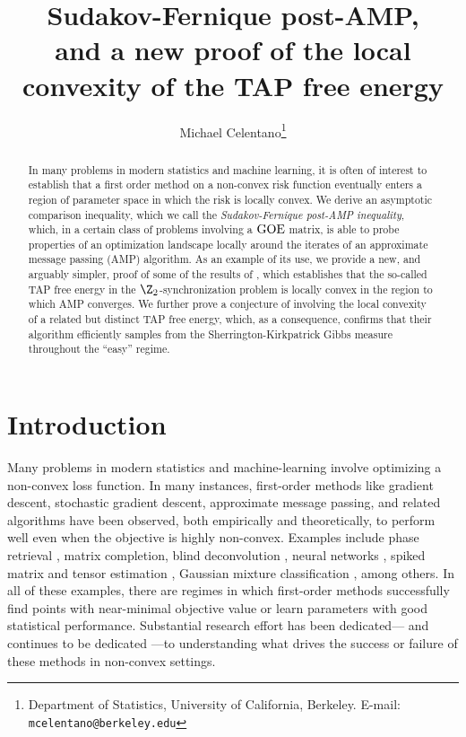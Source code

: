 \documentclass[]{article}
\def\GOE{{\rm GOE}}
\begin{document}
\title{Sudakov-Fernique post-AMP,\\ and a new proof of the local convexity of the TAP free energy}
\author{Michael Celentano\thanks{Department of Statistics, University of California, Berkeley.
E-mail: \texttt{mcelentano@berkeley.edu}}}
\maketitle

\begin{abstract}
    In many problems in modern statistics and machine learning,
    it is often of interest to establish that a first order method on a non-convex risk function eventually enters a region of parameter space in which the risk is locally convex.
    We derive an asymptotic comparison inequality, which we call the \emph{Sudakov-Fernique post-AMP inequality}, which, in a certain class of problems involving a $\GOE$ matrix,
    is able to probe properties of an optimization landscape locally around the iterates of an approximate message passing (AMP) algorithm.
    As an example of its use,
    we provide a new, and arguably simpler, proof of some of the results of \cite{celentanoFanMei2021},
    which establishes that the so-called TAP free energy in the $\Z_2$-synchronization problem is locally convex in the region to which AMP converges.
    We further prove a conjecture of \cite{AlaouiMontanariSelke2022} involving the local convexity of a related but distinct TAP free energy,
    which, as a consequence, confirms that their algorithm efficiently samples from the Sherrington-Kirkpatrick Gibbs measure throughout the ``easy'' regime.
\end{abstract}

\section{Introduction}

Many problems in modern statistics and machine-learning involve optimizing a non-convex loss function.
In many instances, 
first-order methods like gradient descent, stochastic gradient descent, 
approximate message passing, and related algorithms have been observed, both empirically and theoretically, to perform well even when the objective is highly non-convex.
Examples include phase retrieval \cite{candesLi2015,chenCandes2015,Sanghavi2017,Chen2019,caiLi2016}, 
matrix completion,
blind deconvolution \cite{Ma2020},
neural networks \cite{veiga2022,goldt2019,sarao2020}, spiked matrix and tensor estimation \cite{Sarao_Mannelli_2020,manelliKrzakala2019,manelliBiroli2019,manelliBiroli2020}, Gaussian mixture classification \cite{mignacco2020}, among others.
In all of these examples, there are regimes in which first-order methods successfully find points with near-minimal objective value or learn parameters with good statistical performance.
Substantial research effort has been dedicated--- and continues to be dedicated ---to understanding what drives the success or failure of these methods in non-convex settings. 
\end{document}
